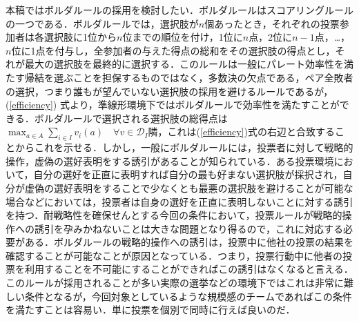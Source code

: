 \documentclass[a4paper, 11pt]{jsarticle}
\begin{document}
本稿ではボルダルールの採用を検討したい．ボルダルールはスコアリングルールの一つである．ボルダルールでは，選択肢が\(n\)個あったとき，それぞれの投票参加者は各選択肢に1位から\(n\)位までの順位を付け，1位に\(n\)点，2位に\(n-1\)点，\dots ，\(n\)位に1点を付与し，全参加者の与えた得点の総和をその選択肢の得点とし，それが最大の選択肢を最終的に選択する．このルールは一般にパレート効率性を満たす帰結を選ぶことを担保するものではなく，多数決の欠点である，ペア全敗者の選択，つまり誰もが望んでいない選択肢の採用を避けるルールであるが， (\ref{efficiency}) 式より，準線形環境下ではボルダルールで効率性を満たすことができる．ボルダルールで選択される選択肢の総得点は\(\max_{a \in A}\sum_{i \in I}v_i(a) \quad \forall v \in \mathscr{D}_I\)隣，これは(\ref{efficiency})式の右辺と合致することからこれを示せる．しかし，一般にボルダルールには，投票者に対して戦略的操作，虚偽の選好表明をする誘引があることが知られている．ある投票環境において，自分の選好を正直に表明すれば自分の最も好まない選択肢が採択され，自分が虚偽の選好表明をすることで少なくとも最悪の選択肢を避けることが可能な場合などにおいては，投票者は自身の選好を正直に表明しないことに対する誘引を持つ．耐戦略性を確保せんとする今回の条件において，投票ルールが戦略的操作への誘引を孕みかねないことは大きな問題となり得るので，これに対応する必要がある．ボルダルールの戦略的操作への誘引は，投票中に他社の投票の結果を確認することが可能なことが原因となっている．つまり，投票行動中に他者の投票を利用することを不可能にすることができればこの誘引はなくなると言える．このルールが採用されることが多い実際の選挙などの環境下ではこれは非常に難しい条件となるが，今回対象としているような規模感のチームであればこの条件を満たすことは容易い．単に投票を個別で同時に行えば良いのだ．
\end{document}
